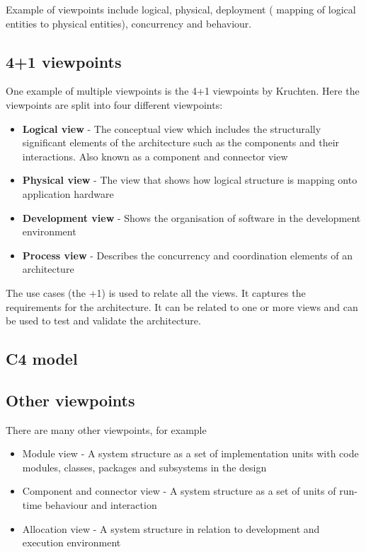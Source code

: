 \documentclass{sty/SizheArticle}
\begin{document}
Example of viewpoints include logical, physical, deployment (
mapping of logical entities to physical entities), concurrency
and behaviour.

\subsection{4+1 viewpoints}
One example of multiple viewpoints is the 4+1 viewpoints by Kruchten.
Here the viewpoints are split into four different viewpoints:
\begin{itemize}
\item \textbf{Logical view} - The conceptual view which includes the
  structurally significant elements of the architecture such as the
  components and their interactions. Also known as a component and
  connector view
\item \textbf{Physical view} - The view that shows how logical
  structure is mapping onto application hardware
\item \textbf{Development view} - Shows the organisation of
  software in the development environment
\item \textbf{Process view} - Describes the concurrency and coordination
  elements of an architecture
\end{itemize}


The use cases (the +1) is used to relate all the views. It captures the
requirements for the architecture. It can be related to one or more
views and can be used to test and validate the architecture.

\subsection{C4 model}


\subsection{Other viewpoints}
There are many other viewpoints, for example
\begin{itemize}
\item Module view - A system structure as a set of implementation units
  with code modules, classes, packages and subsystems in the design
\item Component and connector view - A system structure as a set of
  units of run-time behaviour and interaction
\item Allocation view - A system structure in relation to development
  and execution environment
\end{itemize}
\end{document}
